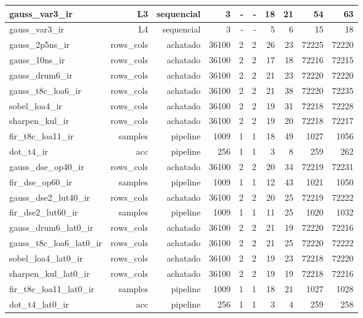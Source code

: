 \begin{table}[htbp]
\begin{tabular}{|l|r|r|r|r|r|r|r|r|r|}
gauss\_var3\_ir & L3 & sequencial & 3 & - & - & 18 & 21 & 54 & 63 \\ \hline
gauss\_var3\_ir & L4 & sequencial & 3 & - & - & 5 & 6 & 15 & 18 \\ \hline
gauss\_2p5ns\_ir & rows\_cols & achatado & 36100 & 2 & 2 & 26 & 23 & 72225 & 72220 \\ \hline
gauss\_10ns\_ir & rows\_cols & achatado & 36100 & 2 & 2 & 17 & 18 & 72216 & 72215 \\ \hline
gauss\_drum6\_ir & rows\_cols & achatado & 36100 & 2 & 2 & 21 & 23 & 72220 & 72220 \\ \hline
gauss\_t8c\_loa6\_ir & rows\_cols & achatado & 36100 & 2 & 2 & 21 & 38 & 72220 & 72235 \\ \hline
sobel\_loa4\_ir & rows\_cols & achatado & 36100 & 2 & 2 & 19 & 31 & 72218 & 72228 \\ \hline
sharpen\_kul\_ir & rows\_cols & achatado & 36100 & 2 & 2 & 19 & 20 & 72218 & 72217 \\ \hline
fir\_t8c\_loa11\_ir & samples & pipeline & 1009 & 1 & 1 & 18 & 49 & 1027 & 1056 \\ \hline
dot\_t4\_ir & acc & pipeline & 256 & 1 & 1 & 3 & 8 & 259 & 262 \\ \hline
gauss\_dse\_op40\_ir & rows\_cols & achatado & 36100 & 2 & 2 & 20 & 34 & 72219 & 72231 \\ \hline
fir\_dse\_op60\_ir & samples & pipeline & 1009 & 1 & 1 & 12 & 43 & 1021 & 1050 \\ \hline
gauss\_dse2\_lut40\_ir & rows\_cols & achatado & 36100 & 2 & 2 & 20 & 25 & 72219 & 72222 \\ \hline
fir\_dse2\_lut60\_ir & samples & pipeline & 1009 & 1 & 1 & 11 & 25 & 1020 & 1032 \\ \hline
gauss\_drum6\_lat0\_ir & rows\_cols & achatado & 36100 & 2 & 2 & 21 & 19 & 72220 & 72216 \\ \hline
gauss\_t8c\_loa6\_lat0\_ir & rows\_cols & achatado & 36100 & 2 & 2 & 21 & 25 & 72220 & 72222 \\ \hline
sobel\_loa4\_lat0\_ir & rows\_cols & achatado & 36100 & 2 & 2 & 19 & 23 & 72218 & 72220 \\ \hline
sharpen\_kul\_lat0\_ir & rows\_cols & achatado & 36100 & 2 & 2 & 19 & 19 & 72218 & 72216 \\ \hline
fir\_t8c\_loa11\_lat0\_ir & samples & pipeline & 1009 & 1 & 1 & 18 & 21 & 1027 & 1028 \\ \hline
dot\_t4\_lat0\_ir & acc & pipeline & 256 & 1 & 1 & 3 & 4 & 259 & 258 \\ \hline

\end{tabular}
\end{table}
